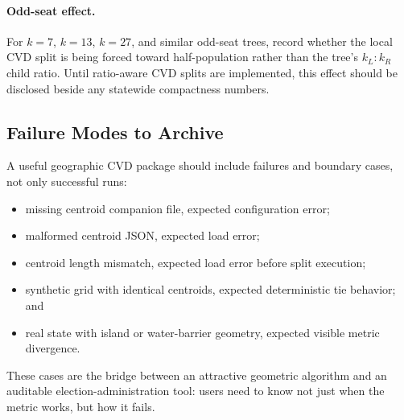 \paragraph{Odd-seat effect.}
For $k=7$, $k=13$, $k=27$, and similar odd-seat trees, record whether the local
CVD split is being forced toward half-population rather than the tree's
$k_L:k_R$ child ratio. Until ratio-aware CVD splits are implemented, this
effect should be disclosed beside any statewide compactness numbers.

\subsection{Failure Modes to Archive}

A useful geographic CVD package should include failures and boundary cases, not
only successful runs:

\begin{itemize}
\item missing centroid companion file, expected configuration error;
\item malformed centroid JSON, expected load error;
\item centroid length mismatch, expected load error before split execution;
\item synthetic grid with identical centroids, expected deterministic tie
  behavior; and
\item real state with island or water-barrier geometry, expected visible
  metric divergence.
\end{itemize}

These cases are the bridge between an attractive geometric algorithm and an
auditable election-administration tool: users need to know not just when the
metric works, but how it fails.
